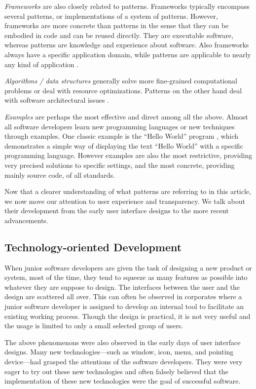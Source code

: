 \documentclass[a4paper,titlepage]{article}
\begin{document}
\textit{Frameworks} are also closely related to patterns. Frameworks
typically encompass several patterns, or implementations of a system
of patterns. However, frameworks are more concrete than patterns in
the sense that they can be embodied in code and can be reused
directly. They are executable software, whereas patterns are knowledge
and experience about software. Also frameworks always have a specific
application domain, while patterns are applicable to nearly any kind
of application \citep{patterns:gamma}.

\textit{Algorithms / data structures} generally solve more
fine-grained computational problems or deal with resource
optimizations. Patterns on the other hand deal with software
architectural issues \citep{patterns:appleton}.

\textit{Examples} are perhaps the most effective and direct among all
the above. Almost all software developers learn new programming
languages or new techniques through examples. One classic example is
the ``Hello World'' program \citep{c:kernighan}, which demonstrates a
simple way of displaying the text ``Hello World'' with a specific
programming language. However examples are also the most restrictive,
providing very precised solutions to specific settings, and the most
concrete, providing mainly source code, of all standards.


Now that a clearer understanding of what patterns are referring to in
this article, we now move our attention to user experience and
transparency. We talk about their development from the early user
interface designs to the more recent advancements.

\subsection{Technology-oriented Development}
When junior software developers are given the task of designing a new
product or system, most of the time, they tend to squeeze as many
features as possible into whatever they are suppose to design. The
interfaces between the user and the design are scattered all
over. This can often be observed in corporates where a junior software
developer is assigned to develop an internal tool to facilitate an
existing working process. Though the design is practical, it is not
very useful and the usage is limited to only a small selected group of
users.

The above phenomenons were also observed in the early days of user
interface designs. Many new technologies---such as window, icon, menu,
and pointing device---had grasped the attentions of the software
developers. They were very eager to try out these new technologies and
often falsely believed that the implementation of these new
technologies were the goal of successful software.
\end{document}
